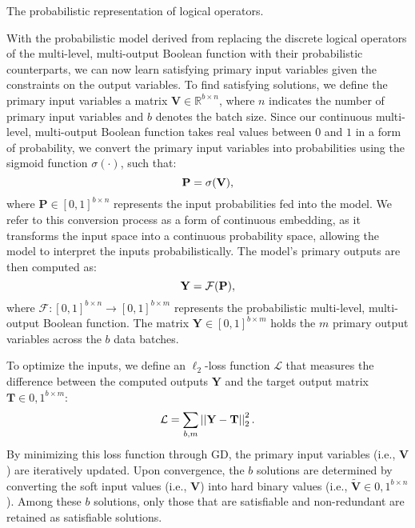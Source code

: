 \begin{table}
    \centering
    \caption{The probabilistic representation of logical operators.}
    
    \label{tab1}
    \vspace{-0.5cm}
\end{table}


With the probabilistic model derived from replacing the discrete logical operators of the multi-level, multi-output Boolean function with their probabilistic counterparts, we can now learn satisfying primary input variables given the constraints on the output variables. To find satisfying solutions, we define the primary input variables a matrix $\textbf{V} \in \mathbb{R}^{b \times n}$, where $n$ indicates the number of primary input variables and $b$ denotes the batch size. Since our continuous multi-level, multi-output Boolean function takes real values between $0$ and $1$ in a form of probability, we convert the primary input variables into probabilities using the sigmoid function $\sigma(\cdot)$, such that:\vspace{-0.2cm}
\begin{equation}
    \textbf{P} = \sigma(\textbf{V}),\vspace{-0.1cm}
\end{equation}
where $\textbf{P} \in [0,1]^{b \times n}$ represents the input probabilities fed into the model. We refer to this conversion process as a form of continuous embedding, as it transforms the input space into a continuous probability space, allowing the model to interpret the inputs probabilistically. The model's primary outputs are then computed as:
\begin{equation}\vspace{-0.1cm}
    \textbf{Y} = \mathcal{F}(\textbf{P}),\vspace{-0.1cm}
\end{equation}
where $\mathcal{F}:[0,1]^{b \times n} \rightarrow [0,1]^{b \times m}$ represents the probabilistic multi-level, multi-output Boolean function. The matrix $\textbf{Y} \in [0,1]^{b \times m}$ holds the $m$ primary output variables across the $b$ data batches.


To optimize the inputs, we define an $\ell_2$-loss function $\mathcal{L}$ that measures the difference between the computed outputs $\textbf{Y}$ and the target output matrix $\textbf{T} \in {0,1}^{b \times m}$:\vspace{-0.2cm}
\begin{equation}
    \mathcal{L} = \sum_{b,m} \left|\left| \textbf{Y} - \textbf{T} \right|\right|^2_2.\vspace{-0.2cm}
\end{equation}
By minimizing this loss function through GD, the primary input variables (i.e., $\textbf{V}$) are iteratively updated. Upon convergence, the $b$ solutions are determined by converting the soft input values (i.e., $\textbf{V}$) into hard binary values (i.e., $\widetilde{\textbf{V}} \in {0, 1}^{b \times n}$). Among these $b$ solutions, only those that are satisfiable and non-redundant are retained as satisfiable solutions.


